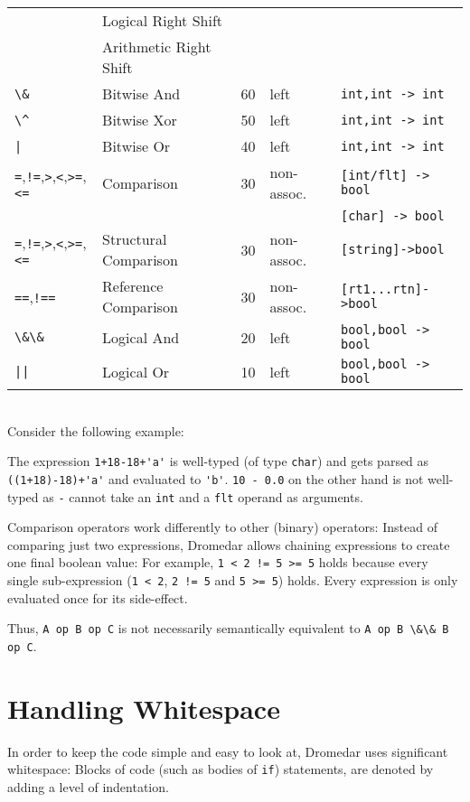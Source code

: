 \documentclass{article}
\newcommand{\code}[1]{\lstinline[columns=fixed]{#1}}
\begin{document}
\begin{tabular}{l|l|c|l|l}
			& Logical Right Shift &&& \\
			& Arithmetic Right Shift &&& \\
			\midrule
			\code{\&} & Bitwise And & 60 & left & \code{int,int -> int}\\
			\midrule
			\code{\^} & Bitwise Xor & 50 & left & \code{int,int -> int}\\
			\midrule
			\code{|} & Bitwise Or & 40 & left & \code{int,int -> int}\\
			\midrule
			\code{=},\code{!=},\code{>},\code{<},\code{>=},\code{<=} & Comparison & 30 & non-assoc. & \code{[int/flt] -> bool} \\
				&&&& \code{[char] -> bool}\\
			\midrule
			\code{=},\code{!=},\code{>},\code{<},\code{>=},\code{<=} & Structural Comparison & 30 & non-assoc. & \code{[string]->bool} \\
			\midrule
			\code{==},\code{!==} & Reference Comparison & 30 & non-assoc. & \code{[rt1...rtn]->bool}\\
			\midrule
			\code{\&\&} & Logical And & 20 & left & \code{bool,bool -> bool}\\
			\midrule
			\code{||} & Logical Or & 10 & left & \code{bool,bool -> bool}
		\end{tabular}\\
	
		Consider the following example:
		
		The expression \code{1+18-18+'a'} is well-typed (of type \code{char}) and gets parsed as \code{((1+18)-18)+'a'} and evaluated to \code{'b'}. \code{10 - 0.0} on the other hand is not well-typed as \code{-} cannot take an \code{int} and a \code{flt} operand as arguments.
		
		Comparison operators work differently to other (binary) operators: Instead of comparing just two expressions, Dromedar allows chaining expressions to create one final boolean value: For example, \code{1 < 2 != 5 >= 5} holds because every single sub-expression (\code{1 < 2}, \code{2 != 5} and \code{5 >= 5}) holds. Every expression is only evaluated once for its side-effect.
		
		Thus, \code{A op B op C} is not necessarily semantically equivalent to \code{A op B \&\& B op C}.
		
	\section{Handling Whitespace}
	
		In order to keep the code simple and easy to look at, Dromedar uses significant whitespace: Blocks of code (such as bodies of \code{if}) statements, are denoted by adding a level of indentation.
		
\end{document}
